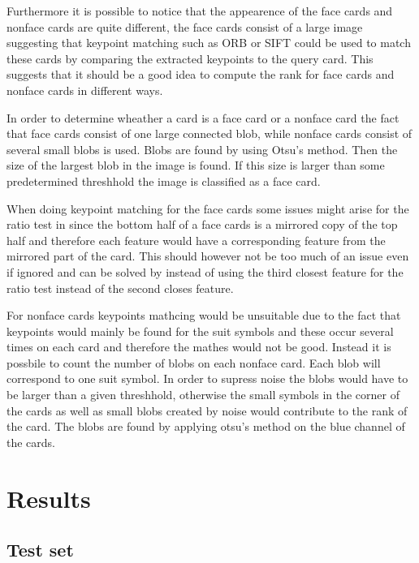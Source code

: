 \documentclass[journal,twoside]{IEEEtran}
\begin{document}
Furthermore it is possible to notice that the appearence of the face cards and nonface cards are quite different, the face cards consist of a large image suggesting that keypoint matching such as ORB or SIFT could be used to match these cards by comparing the extracted keypoints to the query card. This suggests that it should be a good idea to compute the rank for face cards and nonface cards in different ways.

In order to determine wheather a card is a face card or a nonface card the fact that face cards consist of one large connected blob, while nonface cards consist of several small blobs is used. Blobs are found by using Otsu's method. Then the size of the largest blob in the image is found. If this size is larger than some predetermined threshhold the image is classified as a face card.

When doing keypoint matching for the face cards some issues might arise for the ratio test in \cite{SIFT} since the bottom half of a face cards is a mirrored copy of the top half and therefore each feature would have a corresponding feature from the mirrored part of the card. This should however not be too much of an issue even if ignored and can be solved by instead of using the third closest feature for the ratio test instead of the second  closes feature. 

For nonface cards keypoints mathcing would be unsuitable due to the fact that keypoints would mainly be found for the suit symbols and these occur several times on each card and therefore the mathes would not be good.
Instead it is possbile to count the number of blobs on each nonface card. Each blob will correspond to one suit symbol. In order to supress noise the blobs would have to be larger than a given threshhold, otherwise the small symbols in the corner of the cards as well as small blobs created by noise would contribute to the rank of the card. The blobs are found by applying otsu's method on the blue channel of the cards.

\section{Results}

\subsection{Test set}
\end{document}
